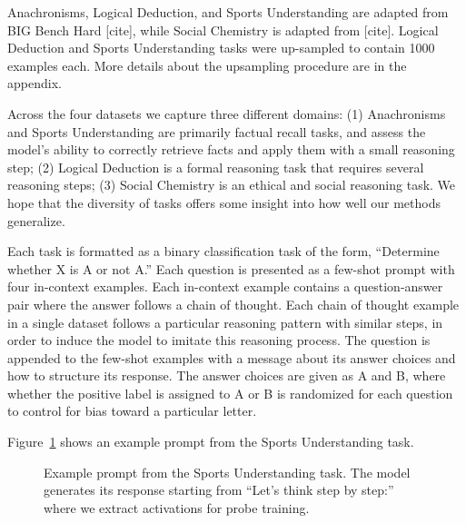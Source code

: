 \documentclass{article}
\begin{document}
Anachronisms, Logical Deduction, and Sports Understanding are adapted from BIG Bench Hard [cite], while Social Chemistry is adapted from [cite]. Logical Deduction and Sports Understanding tasks were up-sampled to contain 1000 examples each. More details about the upsampling procedure are in the appendix.

Across the four datasets we capture three different domains: (1) Anachronisms and Sports Understanding are primarily factual recall tasks, and assess the model's ability to correctly retrieve facts and apply them with a small reasoning step; (2) Logical Deduction is a formal reasoning task that requires several reasoning steps; (3) Social Chemistry is an ethical and social reasoning task. We hope that the diversity of tasks offers some insight into how well our methods generalize.

Each task is formatted as a binary classification task of the form, ``Determine whether X is A or not A.'' Each question is presented as a few-shot prompt with four in-context examples. Each in-context example contains a question-answer pair where the answer follows a chain of thought. Each chain of thought example in a single dataset follows a particular reasoning pattern with similar steps, in order to induce the model to imitate this reasoning process. The question is appended to the few-shot examples with a message about its answer choices and how to structure its response. The answer choices are given as A and B, where whether the positive label is assigned to A or B is randomized for each question to control for bias toward a particular letter. 

Figure~\ref{fig:example-prompt} shows an example prompt from the Sports Understanding task.

\begin{figure}[h]
\centering
{}
\caption{Example prompt from the Sports Understanding task. The model generates its response starting from ``Let's think step by step:'' where we extract activations for probe training.}
\label{fig:example-prompt}
\end{figure}
\end{document}
